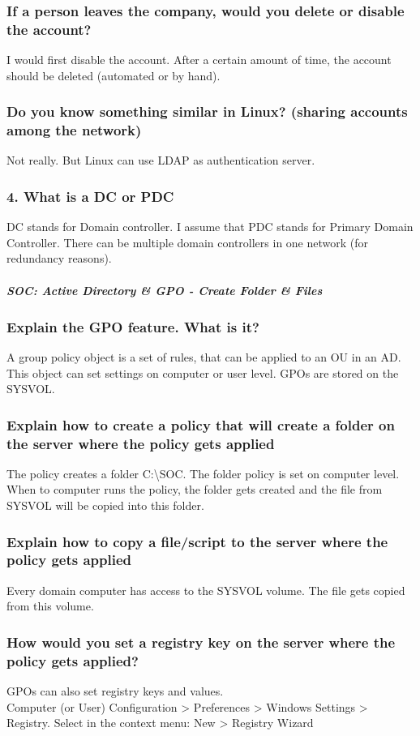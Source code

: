 \subsubsection{If a person leaves the company, would you delete or disable the account?}
I would first disable the account. After a certain amount of time, the account should be deleted (automated or by hand).

\subsubsection{Do you know something similar in Linux? (sharing accounts among the network)}
Not really. But Linux can use LDAP as authentication server.

\subsubsection{4. What is a DC or PDC}
DC stands for Domain controller.
I assume that PDC stands for Primary Domain Controller. There can be multiple domain controllers in one network (for redundancy reasons).


\subparagraph{SOC: Active Directory \& GPO - Create Folder \& Files}
\subsubsection{Explain the GPO feature. What is it?}
A group policy object is a set of rules, that can be applied to an OU in an AD. This object can set settings on computer or user level. GPOs are stored on the SYSVOL.

\subsubsection{Explain how to create a policy that will create a folder on the server where the policy gets applied}
The policy creates a folder C:\textbackslash SOC. The folder policy is set on computer level. When to computer runs the policy, the folder gets created and the file from SYSVOL will be copied into this folder.

\subsubsection{Explain how to copy a file/script to the server where the policy gets applied}
Every domain computer has access to the SYSVOL volume. The file gets copied from this volume.

\subsubsection{How would you set a registry key on the server where the policy gets applied?}
GPOs can also set registry keys and values.\\
Computer (or User) Configuration > Preferences > Windows Settings > Registry. Select in the context menu: New > Registry Wizard

